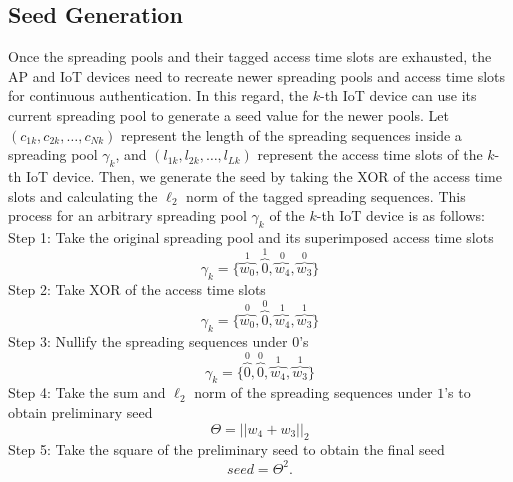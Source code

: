 \documentclass[journal,10pt]{IEEEtran}
\begin{document}
\subsection{Seed Generation}
Once the spreading pools and their tagged access time slots are exhausted, the AP and IoT devices need to recreate newer spreading pools and access time slots for continuous authentication. In this regard, the $k$-th IoT device can use its current spreading pool to generate a seed value for the newer pools. Let $(c_{1k}, c_{2k}, \hdots, c_{Nk})$ represent the length of the spreading sequences inside a spreading pool $\gamma_k$, and $(l_{1k}, l_{2k}, \hdots, l_{Lk})$ represent the access time slots of the $k$-th IoT device. Then, we generate the seed by taking the XOR of the access time slots and calculating the $\ell_2$ norm of the tagged spreading sequences. This process for an arbitrary spreading pool $\gamma_k$ of the $k$-th IoT device is as follows:\\
Step 1: Take the original spreading pool and its superimposed access time slots
\begin{equation}
        \gamma_k =  \{ \overbrace{w_0}^1, \overbrace{0}^1, \overbrace{w_4}^0, \overbrace{w_3}^0  \}
\end{equation}
Step 2: Take XOR of the access time slots
\begin{equation}
        \gamma_k =  \{ \overbrace{w_0}^0, \overbrace{0}^0, \overbrace{w_4}^1, \overbrace{w_3}^1     \}
\end{equation}
Step 3: Nullify the spreading sequences under $0$'s
\begin{equation}
        \gamma_k =  \{ \overbrace{0}^0, \overbrace{0}^0, \overbrace{w_4}^1, \overbrace{w_3}^1     \}
\end{equation}
Step 4: Take the sum and $\ell_2$ norm of the spreading sequences under $1$'s to obtain preliminary seed
\begin{equation} \label{squaringSeed}
        \Theta = \left|\left|    w_4+w_3 \right|\right|_2
\end{equation}
Step 5: Take the square of the preliminary seed to obtain the final seed
\begin{equation}
        seed = \Theta^2.
\end{equation}
\end{document}
